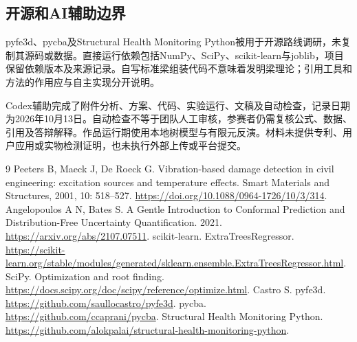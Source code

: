 \documentclass[UTF8,a4paper,11pt,fontset=fandol]{ctexart}
\begin{document}
\subsection{开源和AI辅助边界}
pyfe3d、pycba及Structural Health Monitoring Python被用于开源路线调研\cite{pyfe,pycba,shm}，未复制其源码或数据。直接运行依赖包括NumPy、SciPy、scikit-learn与joblib，项目保留依赖版本及来源记录。自写标准梁组装代码不意味着发明梁理论；引用工具和方法的作用应与自主实现分开说明。

Codex辅助完成了附件分析、方案、代码、实验运行、文稿及自动检查，记录日期为2026年10月13日。自动检查不等于团队人工审核，参赛者仍需复核公式、数据、引用及答辩解释。作品运行期使用本地树模型与有限元反演。材料未提供专利、用户应用或实物检测证明，也未执行外部上传或平台提交。
\vspace{-2mm}
\begin{thebibliography}{9}\footnotesize\setlength{\itemsep}{2pt}
 Peeters B, Maeck J, De Roeck G. Vibration-based damage detection in civil engineering: excitation sources and temperature effects. Smart Materials and Structures, 2001, 10: 518--527. \url{https://doi.org/10.1088/0964-1726/10/3/314}.
 Angelopoulos A N, Bates S. A Gentle Introduction to Conformal Prediction and Distribution-Free Uncertainty Quantification. 2021. \url{https://arxiv.org/abs/2107.07511}.
 scikit-learn. ExtraTreesRegressor. \url{https://scikit-learn.org/stable/modules/generated/sklearn.ensemble.ExtraTreesRegressor.html}.
 SciPy. Optimization and root finding. \url{https://docs.scipy.org/doc/scipy/reference/optimize.html}.
 Castro S. pyfe3d. \url{https://github.com/saullocastro/pyfe3d}.
 pycba. \url{https://github.com/ccaprani/pycba}.
 Structural Health Monitoring Python. \url{https://github.com/alokpalai/structural-health-monitoring-python}.
\end{thebibliography}
\end{document}
